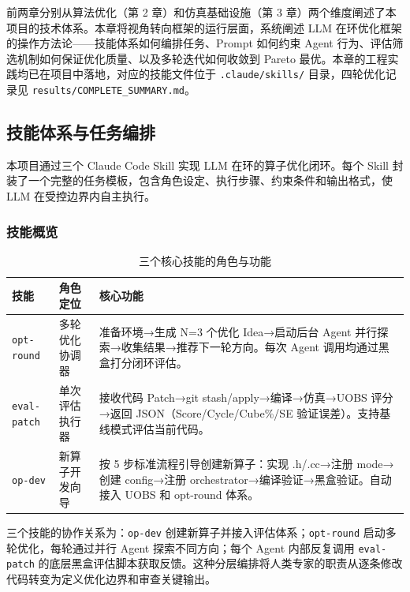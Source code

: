 \documentclass{CjC}
\begin{document}
前两章分别从算法优化（第 2 章）和仿真基础设施（第 3 章）两个维度阐述了本项目的技术体系。本章将视角转向框架的运行层面，系统阐述 LLM 在环优化框架的操作方法论——技能体系如何编排任务、Prompt 如何约束 Agent 行为、评估筛选机制如何保证优化质量、以及多轮迭代如何收敛到 Pareto 最优。本章的工程实践均已在项目中落地，对应的技能文件位于 \texttt{.claude/skills/} 目录，四轮优化记录见 \texttt{results/COMPLETE\_SUMMARY.md}。

\subsection{技能体系与任务编排}

本项目通过三个 Claude Code Skill 实现 LLM 在环的算子优化闭环。每个 Skill 封装了一个完整的任务模板，包含角色设定、执行步骤、约束条件和输出格式，使 LLM 在受控边界内自主执行。

\subsubsection{技能概览}

\begin{table}[H]
    \centering
    \caption{三个核心技能的角色与功能}
    \label{tab:skills-overview}
    \begin{tabular}{p{2.5cm} p{5cm} p{7.5cm}}
    \toprule
    \textbf{技能} & \textbf{角色定位} & \textbf{核心功能} \\
    \midrule
    \texttt{opt-round} & 多轮优化协调器 & 准备环境→生成 N=3 个优化 Idea→启动后台 Agent 并行探索→收集结果→推荐下一轮方向。每次 Agent 调用均通过黑盒打分闭环评估。\\
    \midrule
    \texttt{eval-patch} & 单次评估执行器 & 接收代码 Patch→git stash/apply→编译→仿真→UOBS 评分→返回 JSON（Score/Cycle/Cube\%/SE 验证误差）。支持基线模式评估当前代码。\\
    \midrule
    \texttt{op-dev} & 新算子开发向导 & 按 5 步标准流程引导创建新算子：实现 .h/.cc→注册 mode→创建 config→注册 orchestrator→编译验证→黑盒验证。自动接入 UOBS 和 opt-round 体系。\\
    \bottomrule
    \end{tabular}
\end{table}

三个技能的协作关系为：\texttt{op-dev} 创建新算子并接入评估体系；\texttt{opt-round} 启动多轮优化，每轮通过并行 Agent 探索不同方向；每个 Agent 内部反复调用 \texttt{eval-patch} 的底层黑盒评估脚本获取反馈。这种分层编排将人类专家的职责从逐条修改代码转变为定义优化边界和审查关键输出。
\end{document}
